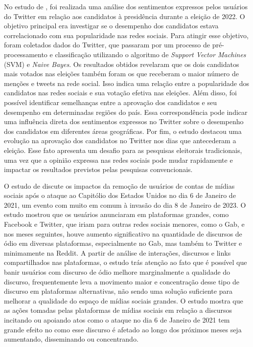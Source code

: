 \documentclass[manuscript,screen,review]{acmart}
\begin{document}
No estudo de \cite{silva2023}, foi realizada uma análise dos sentimentos expressos pelos usuários do Twitter em relação aos candidatos à presidência durante a eleição de 2022. O objetivo principal era investigar se o desempenho dos candidatos estava correlacionado com sua popularidade nas redes sociais. Para atingir esse objetivo, foram coletados dados do Twitter, que passaram por um processo de pré-processamento e classificação utilizando o algoritmo de \textit{Support Vector Machines} (SVM) e \textit{Naive Bayes}. Os resultados obtidos revelaram que os dois candidatos mais votados nas eleições também foram os que receberam o maior número de menções e tweets na rede social. Isso indica uma relação entre a popularidade dos candidatos nas redes sociais e sua votação efetiva nas eleições. Além disso, foi possível identificar semelhanças entre a aprovação dos candidatos e seu desempenho em determinadas regiões do país. Essa correspondência pode indicar uma influência direta dos sentimentos expressos no Twitter sobre o desempenho dos candidatos em diferentes áreas geográficas. Por fim, o estudo destacou uma evolução na aprovação dos candidatos no Twitter nos dias que antecederam a eleição. Esse fato apresenta um desafio para as pesquisas eleitorais tradicionais, uma vez que a opinião expressa nas redes sociais pode mudar rapidamente e impactar os resultados previstos pelas pesquisas convencionais.

O estudo de \cite{buntain2023} discute os impactos da remoção de usuários de contas de mídias sociais após o ataque ao Capitólio dos Estados Unidos no dia 6 de Janeiro de 2021, um evento com muito em comum à invasão do dia 8 de Janeiro de 2023. O estudo mostrou que os usuários anunciaram em plataformas grandes, como Facebook e Twitter, que iriam para outras redes sociais menores, como o Gab, e nos meses seguintes, houve aumento significativo na quantidade de discursos de ódio em diversas plataformas, especialmente no Gab, mas também to Twitter e minimamente na Reddit. A partir de análise de interações, discursos e links compartilhados nas plataformas, o estudo trás atenção ao fato que é possível que banir usuários com discurso de ódio melhore marginalmente a qualidade do discurso, frequentemente leva a movimento maior e concentração desse tipo de discurso em plataformas alternativas, não sendo uma solução suficiente para melhorar a qualidade do espaço de mídias sociais grandes. O estudo mostra que as ações tomadas pelas plataformas de mídias sociais em relação a discursos incitando ou apoiando atos como o ataque no dia 6 de Janeiro de 2021 tem grande efeito no como esse discurso é afetado ao longo dos próximos meses seja aumentando, disseminando ou concentrando.
\end{document}
